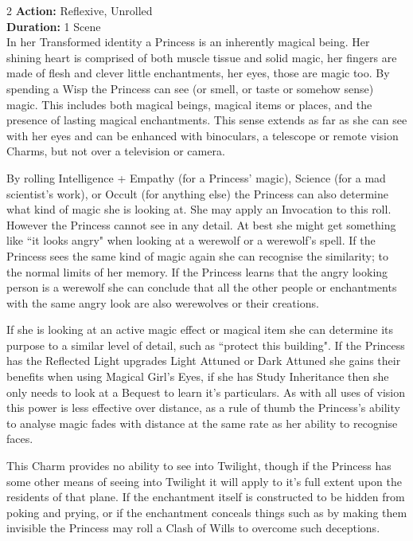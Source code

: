 \begin{multicols}{2}
\noindent \textbf{Action:} Reflexive, Unrolled\\

\noindent \textbf{Duration:} 1 Scene\\

\noindent In her Transformed identity a Princess is an inherently magical being. Her shining heart is comprised of both muscle tissue and solid magic, her fingers are made of flesh and clever little enchantments, her eyes, those are magic too. By spending a Wisp the Princess can see (or smell, or taste or somehow sense) magic. This includes both magical beings, magical items or places, and the presence of lasting magical enchantments. This sense extends as far as she can see with her eyes and can be enhanced with binoculars, a telescope or remote vision Charms, but not over a television or camera.

By rolling Intelligence + Empathy (for a Princess' magic), Science (for a mad scientist's work), or Occult (for anything else) the Princess can also determine what kind of magic she is looking at. She may apply an Invocation to this roll. However the Princess cannot see in any detail. At best she might get something like \textquotedblleft it looks angry" when looking at a werewolf or a werewolf's spell. If the Princess sees the same kind of magic again she can recognise the similarity; to the normal limits of her memory. If the Princess learns that the angry looking person is a werewolf she can conclude that all the other people or enchantments with the same angry look are also werewolves or their creations.

If she is looking at an active magic effect or magical item she can determine its purpose to a similar level of detail, such as \textquotedblleft protect this building". If the Princess has the Reflected Light upgrades Light Attuned or Dark Attuned she gains their benefits when using Magical Girl's Eyes, if she has Study Inheritance then she only needs to look at a Bequest to learn it's particulars. As with all uses of vision this power is less effective over distance, as a rule of thumb the Princess's ability to analyse magic fades with distance at the same rate as her ability to recognise faces.

This Charm provides no ability to see into Twilight, though if the Princess has some other means of seeing into Twilight it will apply to it's full extent upon the residents of that plane. If the enchantment itself is constructed to be hidden from poking and prying, or if the enchantment conceals things such as by making them invisible the Princess may roll a Clash of Wills to overcome such deceptions. 


\end{multicols}
